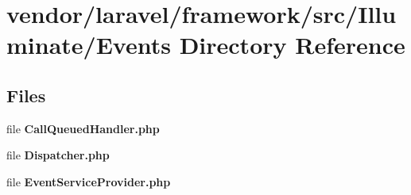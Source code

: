 \section{vendor/laravel/framework/src/\+Illuminate/\+Events Directory Reference}
\label{dir_23714782efba945c161261dffaab3cbd}
\subsection*{Files}
\begin{DoxyCompactItemize}
\item 
file {\bf Call\+Queued\+Handler.\+php}
\item 
file {\bf Dispatcher.\+php}
\item 
file {\bf Event\+Service\+Provider.\+php}
\end{DoxyCompactItemize}
